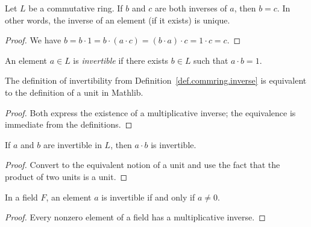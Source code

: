 \begin{lemma}
\label{lem.commring.inverse-uni}
\leanhelper
\leanok
Let $L$ be a commutative ring. If $b$ and $c$ are both inverses of $a$,
then $b = c$. In other words, the inverse of an element (if it exists) is unique.
\end{lemma}

\begin{proof}
\leanok
We have $b = b \cdot 1 = b \cdot (a \cdot c) = (b \cdot a) \cdot c = 1 \cdot c = c$.
\end{proof}

\begin{definition}
\label{def.commring.invertible}
\leanhelper
\leanok
An element $a \in L$ is \emph{invertible} if there exists $b \in L$ such that
$a \cdot b = 1$.
\end{definition}

\begin{lemma}
\label{lem.commring.invertible-iff-isUnit}
\leanhelper
\leanok
The definition of invertibility from Definition~\ref{def.commring.inverse} is equivalent
to the definition of a unit in Mathlib.
\end{lemma}

\begin{proof}
\leanok
Both express the existence of a multiplicative inverse; the equivalence is
immediate from the definitions.
\end{proof}

\begin{lemma}
\label{lem.commring.invertible-mul}
\leanhelper
\leanok
If $a$ and $b$ are invertible in $L$, then $a \cdot b$ is invertible.
\end{lemma}

\begin{proof}
\leanok
Convert to the equivalent notion of a unit and use the fact that the product
of two units is a unit.
\end{proof}

\begin{lemma}
\label{lem.commring.field-isUnit}
\leanhelper
\leanok
In a field $F$, an element $a$ is invertible if and only if $a \neq 0$.
\end{lemma}

\begin{proof}
\leanok
Every nonzero element of a field has a multiplicative inverse.
\end{proof}

